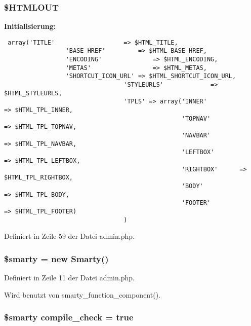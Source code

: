 \subsubsection{\setlength{\rightskip}{0pt plus 5cm}\$HTMLOUT}\label{admin_8php_82fec0cae9d257032edd8d9f6408f8a7}


\textbf{Initialisierung:}

\begin{Code}\begin{verbatim} array('TITLE'                   => $HTML_TITLE,
                 'BASE_HREF'         => $HTML_BASE_HREF,
                 'ENCODING'              => $HTML_ENCODING,
                 'METAS'                 => $HTML_METAS,
                 'SHORTCUT_ICON_URL' => $HTML_SHORTCUT_ICON_URL,
                                 'STYLEURLS'             => $HTML_STYLEURLS,
                                 'TPLS' => array('INNER'             => $HTML_TPL_INNER,
                                                 'TOPNAV'            => $HTML_TPL_TOPNAV,
                                                 'NAVBAR'            => $HTML_TPL_NAVBAR,
                                                 'LEFTBOX'           => $HTML_TPL_LEFTBOX,
                                                 'RIGHTBOX'      => $HTML_TPL_RIGHTBOX,
                                                 'BODY'              => $HTML_TPL_BODY,
                                                 'FOOTER'            => $HTML_TPL_FOOTER)
                                 )
\end{verbatim}
\end{Code}


Definiert in Zeile 59 der Datei admin.php.
\subsubsection{\setlength{\rightskip}{0pt plus 5cm}\$smarty = new Smarty()}\label{admin_8php_c3ae29e9ccbb2006fa26fd9eb2c12117}




Definiert in Zeile 11 der Datei admin.php.

Wird benutzt von smarty\_\-function\_\-component().
\subsubsection{\setlength{\rightskip}{0pt plus 5cm}\$smarty {\bf compile\_\-check} = true}\label{admin_8php_160ced53880d9983f99956b729e6f78a}




